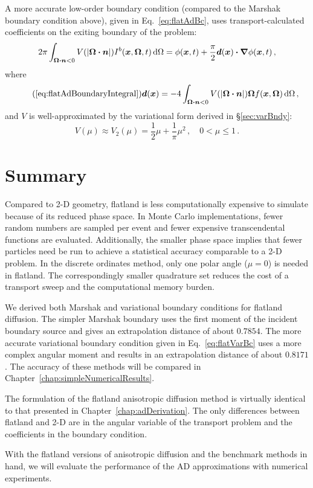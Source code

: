 A more accurate low-order boundary condition (compared to the Marshak
boundary condition above), given in Eq.~\eqref{eq:flatAdBc}, uses
transport-calculated coefficients on the exiting boundary of the problem:
\begin{equation*}
2\pi \int_{\bm{\Omega}\bm{\cdot}\bm{n} < 0} V( \left| \bm{\Omega}\bm{\cdot}\bm{n} \right|)
I^b(\bm{x}, \bm{\Omega},t) \mathop{}\!\mathrm{d}\Omega
=
\phi(\bm{x},t)
+ \frac{\pi}{2} \bm{d}(\bm{x}) \bm{\cdot} \bm{\nabla} \phi(\bm{x},t)\,,
\end{equation*}
where
\begin{equation}\tag{\ref{eq:flatAdBoundaryIntegral}}
  \vec{d}(\vec{x}) = -4\int_{\vec{\Omega}\vd\vec{n} < 0}
  V(\abs{\vec{\Omega}\vd\vec{n}})
\vec{\Omega} f(\vec{x}, \vec{\Omega}) \ud\Omega\,,
\end{equation}
and $V$ is well-approximated by the variational form derived in
\S\ref{sec:varBndy}:
\begin{equation*}
  V(\mu) \approx V_2(\mu) =  \frac{1}{2} \mu + \frac{1}{\pi}\mu^2 \,,
  \quad 0 < \mu \le 1 \,.
\end{equation*}

\section{Summary}
Compared to 2-D geometry, flatland is less computationally expensive to
simulate because of its reduced phase space. In Monte Carlo
implementations, fewer random numbers are sampled per event and fewer expensive
transcendental functions are evaluated. Additionally, the smaller phase space
implies that fewer particles need be run to achieve a statistical
accuracy comparable to a 2-D problem. In the discrete ordinates method, only
one polar angle ($\mu=0$) is needed in flatland. The correspondingly smaller
quadrature set reduces
the cost of a transport sweep and the computational memory burden.

We derived both Marshak and variational boundary conditions for flatland
diffusion. The simpler Marshak boundary uses
the first moment of the incident boundary source and gives an extrapolation
distance of about $0.7854$.
The more accurate variational boundary condition given in
Eq.~\eqref{eq:flatVarBc} uses a more complex angular moment and results in
an extrapolation
distance of about $0.8171$. The accuracy of these methods will be compared in
Chapter~\ref{chap:simpleNumericalResults}.

The formulation of the flatland anisotropic diffusion method is virtually
identical to
that presented in Chapter~\ref{chap:adDerivation}. The only differences between
flatland and 2-D are in the angular variable of the transport problem and the
coefficients in the boundary condition.

With the flatland versions of anisotropic diffusion and the benchmark methods in
hand, we will evaluate the performance of the AD approximations with numerical
experiments.

